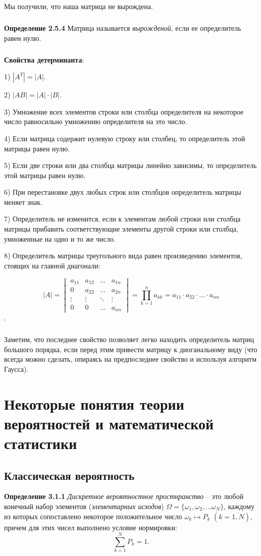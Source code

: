 \documentclass[12pt,a4paper]{article}
\begin{document}
Мы получили, что наша матрица не вырождена.

\subparagraph{}
\textbf{Определение 2.5.4} 
Матрица называется \textit{вырожденой}, если ее определитель равен нулю.

\subparagraph{}
\textbf{Свойства детерминанта}:

1) $|A^T| = |A|$.

2) $|AB| = |A| \cdot |B|$.

3) Умножение всех элементов строки или столбца определителя на некоторое число равносильно умножению определителя на это число.

4) Если матрица содержит нулевую строку или столбец, то определитель этой матрицы равен нулю.

5) Если две строки или два столбца матрицы линейно зависимы, то определитель этой матрицы равен нулю.

6) При перестановке двух любых строк или столбцов определитель матрицы меняет знак.

7)  Определитель не изменится, если к элементам любой строки или столбца матрицы прибавить соответствующие элементы другой строки или столбца, умноженные на одно и то же число.

8) Определитель матрицы треугольного вида равен произведению элементов, стоящих на главной диагонали:

\[
|A| = \begin{vmatrix}
a_{11}& a_{12} &\ldots & a_{1n}\\
0 & a_{22} &\ldots & a_{2n}\\
\vdots& \vdots &\ddots & \vdots\\
0& 0 &\ldots & a_{nn}
\end{vmatrix} = \prod_{k = 1}^n a_{kk} = a_{11} \cdot a_{22} \cdot \ldots \cdot a_{nn} 
\].

\subparagraph{}
Заметим, что последнее свойство позволяет легко находить определитель матриц большого порядка, если перед этим привести матрицу к диоганальному виду (что всегда можно сделать, опираясь на предпоследнее свойство и используя алгоритм Гаусса).

\newpage
\section{Некоторые понятия теории вероятностей и математической статистики}
\subsection{Классическая вероятность}
\textbf{Определение 3.1.1} 
\textit{Дискретное вероятностное простнранство} -- это любой конечный набор элементов (\textit{элементарных исходов}) $\Omega = \{\omega_1, \omega_2, \ldots\omega_N\}$, каждому из которых сопоставлено некоторое положительное число $\omega_k \longmapsto P_k$ $(k = \overline{1, N})$, причем для этих чисел выполнено условие нормировки:
\[\sum_{k = 1}^N P_k = 1.\]
\end{document}
